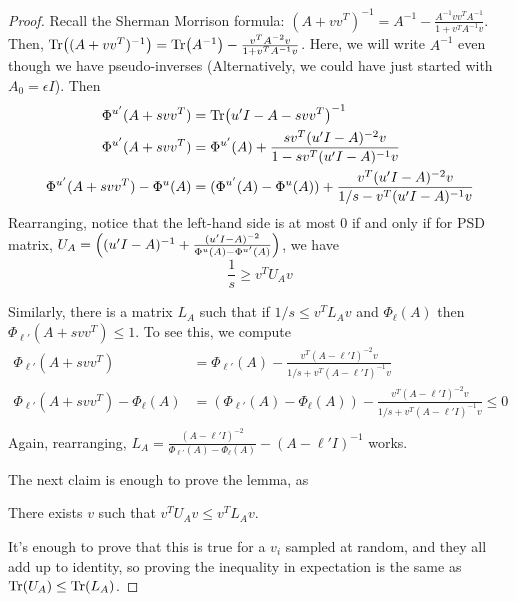 \begin{proof}
    Recall the Sherman Morrison formula: $(A + vv^T)^{-1} = A^{-1} - \frac{A^{-1} vv^T A^{-1}}{1 + v^T A^{-1} v}$.
    Then, $\Tr((A+vv^T)^{-1}) = \Tr(A^{-1}) - \frac{v^T A^{-2} v}{1 + v^T A^{-1} v}$. Here, we will write $A^{-1}$ even though
    we have pseudo-inverses (Alternatively, we could have just started with $A_0 = \epsilon I$).
    Then
    \begin{align*}
        \Phi^{u'}(A + svv^T) &= \Tr(u'I - A - svv^T)^{-1} \\
        \Phi^{u'}(A + svv^T) &= \Phi^{u'}(A) + \frac{sv^T (u' I - A)^{-2} v }{1 - sv^T (u'I- A)^{-1} v} \\
        \Phi^{u'}(A + svv^T) - \Phi^u(A) &=  (\Phi^{u'}(A) - \Phi^u(A)) + \frac{v^T (u'I-A)^{-2} v}{1/s - v^T(u'I -A)^{-1} v}
    \end{align*}
    Rearranging, notice that the left-hand side is at most $0$ if and only if
    for PSD matrix, $U_A = \qty((u'I-A)^{-1}+ \frac{(u'I - A)^{-2}}{\Phi^{u} (A) - \Phi^{u'}(A)})$,
    we have
    \[ \frac{1}{s} \ge v^T U_A v \]

    Similarly, there is a matrix $L_A$ such that if $1/s \le v^T L_A v$
    and $\Phi_{\ell}(A)$
    then $\Phi_{\ell'}(A + svv^T) \le 1$. To see this,
    we compute
    \begin{align*}
        \Phi_{\ell'}(A + svv^T) &= \Phi_{\ell'}(A) - \frac{v^T (A - \ell' I)^{-2} v}{1/s + v^T(A - \ell' I)^{-1}v} \\
        \Phi_{\ell'}(A +svv^T) - \Phi_{\ell}(A) &= (\Phi_{\ell'}(A) - \Phi_{\ell}(A)) - \frac{v^T (A - \ell' I)^{-2} v}{1/s + v^T (A - \ell' I)^{-1} v} \le 0 \\
    \end{align*}
    Again, rearranging, $L_A = \frac{(A - \ell' I)^{-2}}{\Phi_{\ell'}(A) - \Phi_{\ell}(A)} - (A - \ell' I)^{-1}$
    works.

    The next claim is enough to prove the lemma, as 
    \begin{lemma}
        There exists $v$ such that $v^T U_A v \le v^T L_A v$.
    \end{lemma}
    It's enough to prove that this is true for a $v_i$ sampled at random,
    and they all add up to identity,
    so proving the inequality in expectation is the same as $\Tr(U_A) \le \Tr(L_A)$.


\end{proof}
